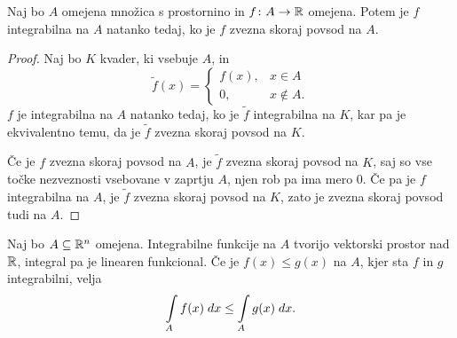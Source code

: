 \begin{trditev}
Naj bo $A$ omejena množica s prostornino in $f \colon A \to \mathbb{R}$
omejena. Potem je $f$ integrabilna na $A$ natanko tedaj, ko je $f$
zvezna skoraj povsod na $A$.
\end{trditev}

\begin{proof}
Naj bo $K$ kvader, ki vsebuje $A$, in
\[
\widetilde{f}(x) = \begin{cases}
f(x), &x \in A
\\
0, &x \not \in A.
\end{cases}
\]
$f$ je integrabilna na $A$ natanko tedaj, ko je $\widetilde{f}$
integrabilna na $K$, kar pa je ekvivalentno temu, da je
$\widetilde{f}$ zvezna skoraj povsod na $K$.

Če je $f$ zvezna skoraj povsod na $A$, je $\widetilde{f}$ zvezna
skoraj povsod na $K$, saj so vse točke nezveznosti vsebovane v
zaprtju $A$, njen rob pa ima mero $0$. Če pa je $f$ integrabilna
na $A$, je $\widetilde{f}$ zvezna skoraj povsod na $K$, zato je
zvezna skoraj povsod tudi na $A$.
\end{proof}

\begin{trditev}
Naj bo $A \subseteq \mathbb{R}^n$ omejena. Integrabilne funkcije na $A$
tvorijo vektorski prostor nad $\mathbb{R}$, integral pa je linearen
funkcional. Če je $f(x) \leq g(x)$ na $A$, kjer sta $f$ in $g$
integrabilni, velja
\[
\int\limits_A f(x)\;dx \leq \int\limits_A g(x)\;dx.
\]
\end{trditev}

\obvs
